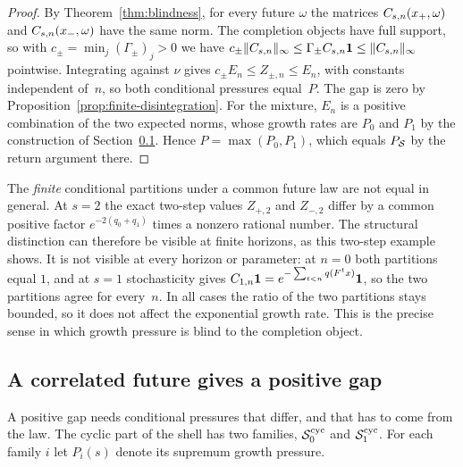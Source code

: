 \begin{proof}
By Theorem~\ref{thm:blindness}, for every future $\omega$ the matrices $C_{s,n}(x_{+},\omega)$ and $C_{s,n}(x_{-},\omega)$ have the same norm. The completion objects have full support, so with $c_\pm=\min_j(\Gamma_\pm)_j>0$ we have $c_\pm\lVert C_{s,n}\rVert_{\infty}\le\Gamma_\pm C_{s,n}\mathbf{1}\le\lVert C_{s,n}\rVert_{\infty}$ pointwise. Integrating against $\nu$ gives $c_\pm E_n\le Z_{\pm,n}\le E_n$, with constants independent of~$n$, so both conditional pressures equal~$P$. The gap is zero by Proposition~\ref{prop:finite-disintegration}. For the mixture, $E_n$ is a positive combination of the two expected norms, whose growth rates are $P_0$ and $P_1$ by the construction of Section~\ref{sec:positive-gap}. Hence $P=\max(P_0,P_1)$, which equals $P_{\mathcal{S}}$ by the return argument there.
\end{proof}

The \emph{finite} conditional partitions under a common future law are not equal in general. At $s=2$ the exact two-step values $Z_{+,2}$ and $Z_{-,2}$ differ by a common positive factor $e^{-2(q_0+q_1)}$ times a nonzero rational number. The structural distinction can therefore be visible at finite horizons, as this two-step example shows. It is not visible at every horizon or parameter: at $n=0$ both partitions equal $1$, and at $s=1$ stochasticity gives $C_{1,n}\mathbf{1}=e^{-\sum_{t<n}q(F^tx)}\mathbf{1}$, so the two partitions agree for every~$n$. In all cases the ratio of the two partitions stays bounded, so it does not affect the exponential growth rate. This is the precise sense in which growth pressure is blind to the completion object.

\subsection{A correlated future gives a positive gap}\label{sec:positive-gap}

A positive gap needs conditional pressures that differ, and that has to come from the law. The cyclic part of the shell has two families, $\mathcal{S}_0^{\mathrm{cyc}}$ and $\mathcal{S}_1^{\mathrm{cyc}}$. For each family $i$ let $P_i(s)$ denote its supremum growth pressure.

